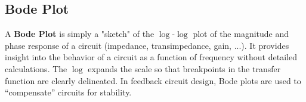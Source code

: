 \subsection{Bode Plot}
A \textbf{Bode Plot} is simply a "sketch" of the $\log$-$\log$ plot of the magnitude and phase response of a circuit (impedance, transimpedance, gain, ...).  It provides insight into the behavior of a circuit as a function of frequency without detailed calculations.  The $\log$ expands the scale so that breakpoints in the transfer function are clearly delineated.  In feedback circuit design, Bode plots are used to “compensate” circuits for stability.
